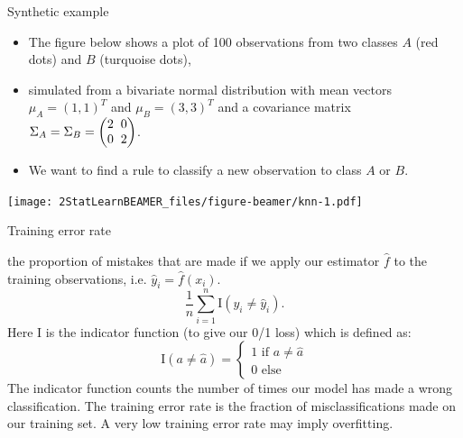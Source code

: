 \documentclass[ignorenonframetext,]{beamer}
\providecommand{\tightlist}{%
  \setlength{\itemsep}{0pt}\setlength{\parskip}{0pt}}
\begin{document}
\begin{frame}

\begin{block}{Synthetic example}

\begin{itemize}
\tightlist
\item
  The figure below shows a plot of 100 observations from two classes
  \(A\) (red dots) and \(B\) (turquoise dots),
\item
  simulated from a bivariate normal distribution with mean vectors
  \(\mu_A = (1, 1)^T\) and \(\mu_B = (3, 3)^T\) and a covariance matrix
  \(\Sigma_A = \Sigma_B = \begin{pmatrix} 2\hspace{2mm} 0 \\ 0 \hspace{2mm} 2 \end{pmatrix}\).
\item
  We want to find a rule to classify a new observation to class \(A\) or
  \(B\).
\end{itemize}

\end{block}

\end{frame}

\begin{frame}

\texttt{[image: 2StatLearnBEAMER\_files/figure-beamer/knn-1.pdf]}

\end{frame}

\begin{frame}

\begin{block}{Training error rate}

the proportion of mistakes that are made if we apply our estimator
\(\hat{f}\) to the training observations, i.e.
\(\hat{y}_i=\hat{f}(x_i)\).
\[\frac{1}{n}\sum_{i=1}^n \text{I}(y_i \neq \hat{y}_i).\] Here I is the
indicator function (to give our 0/1 loss) which is defined as:
\[\text{I}(a\neq\hat{a}) = \begin{cases} 1 \text{ if } a \neq \hat{a} \\ 0 \text{ else } \end{cases}\]
The indicator function counts the number of times our model has made a
wrong classification. The training error rate is the fraction of
misclassifications made on our training set. A very low training error
rate may imply overfitting.

\end{block}

\end{frame}
\end{document}
